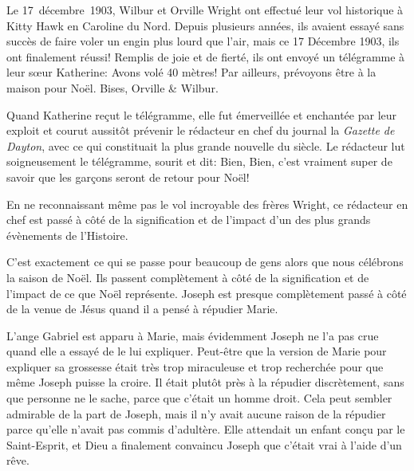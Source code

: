 

Le 17~décembre~1903, Wilbur et Orville Wright ont effectué leur vol historique à Kitty Hawk en Caroline du Nord. Depuis plusieurs années, ils avaient essayé sans succès de faire voler un engin plus lourd que l'air, mais ce 17 Décembre 1903, ils ont finalement réussi! Remplis de joie et de fierté, ils ont envoyé un télégramme à leur sœur Katherine: \og Avons volé 40 mètres! Par ailleurs, prévoyons être à la maison pour Noël. Bises, Orville \& Wilbur. \fg{}

Quand Katherine reçut le télégramme, elle fut émerveillée et enchantée par leur exploit et courut aussitôt prévenir le rédacteur en chef du journal la \emph{Gazette de Dayton}, avec ce qui constituait la plus grande nouvelle du siècle. Le rédacteur lut soigneusement le télégramme, sourit et dit: \og Bien, Bien, c'est vraiment super de savoir que les garçons seront de retour pour Noël! \fg{}

En ne reconnaissant même pas le vol incroyable des frères Wright, ce rédacteur en chef est passé à côté de la signification et de l'impact d'un des plus grands évènements de l'Histoire.

C'est exactement ce qui se passe pour beaucoup de gens alors que nous célébrons la saison de Noël. Ils passent complètement à côté de la signification et de l'impact de ce que Noël représente. Joseph est presque complètement passé à côté de la venue de Jésus quand il a pensé à répudier Marie.

L'ange Gabriel est apparu à Marie, mais évidemment Joseph ne l'a pas crue quand elle a essayé de le lui expliquer. Peut-être que la version de Marie pour expliquer sa grossesse était très trop miraculeuse et trop recherchée pour que même Joseph puisse la croire. Il était plutôt près à la répudier discrètement, sans que personne ne le sache, parce que c'était un homme droit. Cela peut sembler admirable de la part de Joseph, mais il n'y avait aucune raison de la répudier parce qu'elle n'avait pas commis d'adultère. Elle attendait un enfant conçu par le Saint-Esprit, et Dieu a finalement convaincu Joseph que c'était vrai à l'aide d'un rêve.

